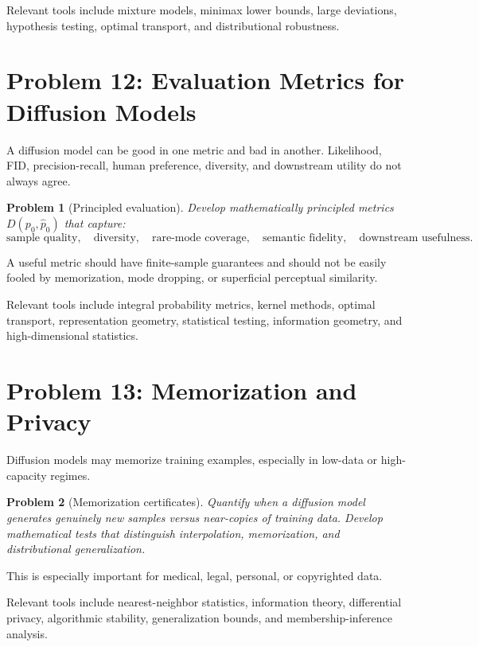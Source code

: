 \documentclass[11pt]{article}
\newtheorem{problem}{Problem}
\begin{document}
Relevant tools include mixture models, minimax lower bounds, large deviations, hypothesis testing, optimal transport, and distributional robustness.

\section{Problem 12: Evaluation Metrics for Diffusion Models}

A diffusion model can be good in one metric and bad in another. Likelihood, FID, precision-recall, human preference, diversity, and downstream utility do not always agree.

\begin{problem}[Principled evaluation]
Develop mathematically principled metrics $D(p_0,\widehat{p}_0)$ that capture:
\begin{equation}
\text{sample quality},
\quad
\text{diversity},
\quad
\text{rare-mode coverage},
\quad
\text{semantic fidelity},
\quad
\text{downstream usefulness}.
\end{equation}
\end{problem}

A useful metric should have finite-sample guarantees and should not be easily fooled by memorization, mode dropping, or superficial perceptual similarity.

Relevant tools include integral probability metrics, kernel methods, optimal transport, representation geometry, statistical testing, information geometry, and high-dimensional statistics.

\section{Problem 13: Memorization and Privacy}

Diffusion models may memorize training examples, especially in low-data or high-capacity regimes.

\begin{problem}[Memorization certificates]
Quantify when a diffusion model generates genuinely new samples versus near-copies of training data. Develop mathematical tests that distinguish interpolation, memorization, and distributional generalization.
\end{problem}

This is especially important for medical, legal, personal, or copyrighted data.

Relevant tools include nearest-neighbor statistics, information theory, differential privacy, algorithmic stability, generalization bounds, and membership-inference analysis.
\end{document}
